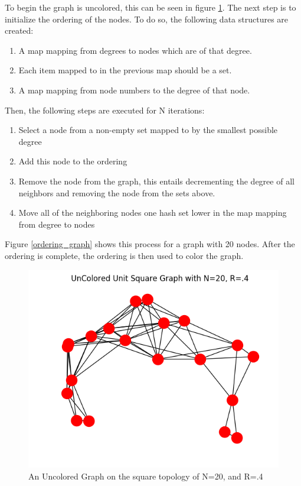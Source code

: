 \documentclass{article}
\begin{document}
    To begin the graph is uncolored, this can be seen in figure \ref{uncolored_graph}.
    The next step is to initialize the ordering of the nodes.
    To do so, the following data structures are created:
    \begin{enumerate}
      \item A map mapping from degrees to nodes which are of that degree.
      \item Each item mapped to in the previous map should be a set.
      \item A map mapping from node numbers to the degree of that node.
    \end{enumerate}
    Then, the following steps are executed for N iterations:
    \begin{enumerate}
      \item Select a node from a non-empty set mapped to by the smallest possible degree
      \item Add this node to the ordering
      \item Remove the node from the graph, this entails decrementing the degree of all neighbors and removing the node from the sets above.
      \item Move all of the neighboring nodes one hash set lower in the map mapping from degree to nodes
    \end{enumerate}
    Figure \ref{ordering_graph} shows this process for a graph with 20 nodes.
    After the ordering is complete, the ordering is then used to color the graph.

    \begin{figure}
      \centering
      \label{uncolored_graph}
      \includegraphics[width=1 \textwidth]{walkthrough/uncolored}
      \caption{An Uncolored Graph on the square topology of N=20, and R=.4}
    \end{figure}
\end{document}
